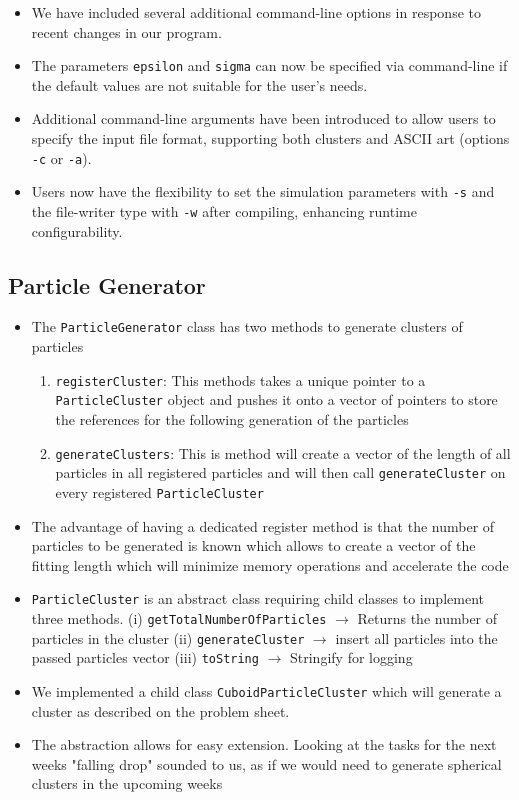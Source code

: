 \documentclass{article}
\begin{document}
\begin{itemize}
    \item We have included several additional command-line options in response to recent changes in our program.
    \item The parameters \texttt{epsilon} and \texttt{sigma} can now be specified via command-line if the default values are not suitable for the user's needs.
    \item Additional command-line arguments have been introduced to allow users to specify the input file format, supporting both clusters and ASCII art (options \texttt{-c} or \texttt{-a}).
    \item Users now have the flexibility to set the simulation parameters with \texttt{-s} and the file-writer type with \texttt{-w} after compiling, enhancing runtime configurability.
\end{itemize}

\subsection{Particle Generator}
\label{subsec:particleGenerator}

\begin{itemize}
    \item The \verb|ParticleGenerator| class has two methods to generate clusters of particles
    \begin{enumerate}
        \item \verb|registerCluster|: This methods takes a unique pointer to a \verb|ParticleCluster| object and pushes it onto a vector of pointers to store the references for the following generation of the particles
        \item \verb|generateClusters|: This is method will create a vector of the length of all particles in all registered particles and will then call \verb|generateCluster| on every registered \verb|ParticleCluster|
    \end{enumerate}
    \item The advantage of having a dedicated register method is that the number of particles to be generated is known which allows to create a vector of the fitting length which will minimize memory operations and accelerate the code
    \item \verb|ParticleCluster| is an abstract class requiring child classes to implement three methods. (i) \verb|getTotalNumberOfParticles| $\rightarrow$ Returns the number of particles in the cluster (ii) \verb|generateCluster| $\rightarrow$ insert all particles into the passed particles vector (iii) \verb|toString| $\rightarrow$ Stringify for logging
    \item We implemented a child class \verb|CuboidParticleCluster| which will generate a cluster as described on the problem sheet.
    \item The abstraction allows for easy extension. Looking at the tasks for the next weeks "falling drop" sounded to us, as if we would need to generate spherical clusters in the upcoming weeks
\end{itemize}
\end{document}
